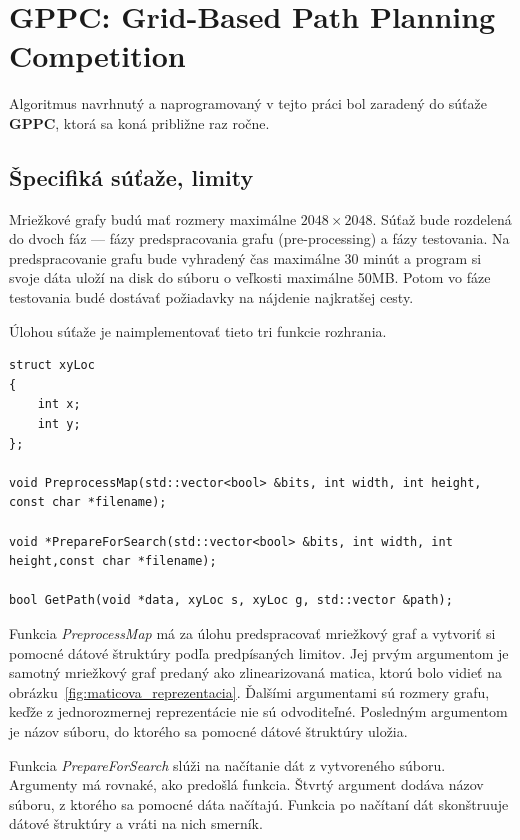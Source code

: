 \section{GPPC: Grid-Based Path Planning Competition}
Algoritmus navrhnutý a naprogramovaný v tejto práci bol zaradený do súťaže \textbf{GPPC}, ktorá sa koná približne raz ročne.

\subsection{Špecifiká súťaže, limity}

Mriežkové grafy budú mať rozmery maximálne $2048 \times 2048$.
Súťaž bude rozdelená do dvoch fáz --- fázy predspracovania grafu (pre-processing)
a fázy testovania. Na predspracovanie grafu bude vyhradený čas
maximálne 30 minút a program si svoje dáta uloží na disk do súboru o veľkosti maximálne 50MB.
Potom vo fáze testovania budé dostávať požiadavky na nájdenie najkratšej cesty.

Úlohou súťaže je naimplementovať tieto tri funkcie rozhrania.


\begin{lstlisting}
struct xyLoc 
{
    int x;
    int y;
};

void PreprocessMap(std::vector<bool> &bits, int width, int height, const char *filename);
                   
void *PrepareForSearch(std::vector<bool> &bits, int width, int height,const char *filename);

bool GetPath(void *data, xyLoc s, xyLoc g, std::vector &path);
\end{lstlisting}

Funkcia \emph{PreprocessMap} má za úlohu predspracovať
mriežkový graf a vytvoriť si pomocné dátové štruktúry podľa predpísaných limitov. Jej prvým argumentom 
je samotný mriežkový graf predaný ako zlinearizovaná matica, ktorú bolo vidieť na obrázku~\ref{fig:maticova_reprezentacia}. Ďalšími argumentami sú rozmery grafu,
keďže z jednorozmernej reprezentácie nie sú odvoditeľné. Posledným argumentom je názov súboru, do ktorého sa pomocné dátové štruktúry uložia.

Funkcia \emph{PrepareForSearch} slúži na načítanie dát z vytvoreného súboru. Argumenty má rovnaké, ako predošlá funkcia. Štvrtý argument
dodáva názov súboru, z ktorého sa pomocné dáta načítajú. Funkcia po načítaní dát skonštruuje dátové štruktúry a vráti na nich smerník.

